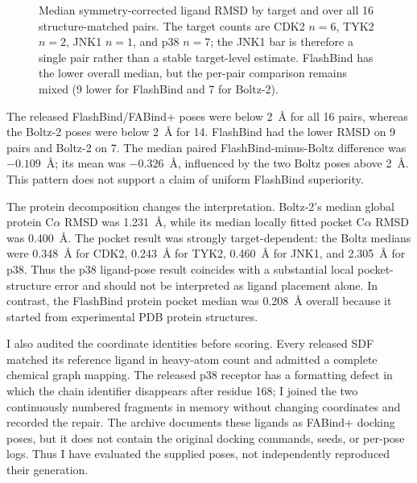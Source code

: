 \documentclass[11pt]{article}
\begin{document}
\begin{figure}[H]
\centering
{}
\caption{Median symmetry-corrected ligand RMSD by target and over all 16
structure-matched pairs. The target counts are CDK2 $n=6$, TYK2 $n=2$, JNK1
$n=1$, and p38 $n=7$; the JNK1 bar is therefore a single pair rather than a
stable target-level estimate. FlashBind has the lower overall median, but the
per-pair comparison remains mixed (9 lower for FlashBind and 7 for Boltz-2).}
\end{figure}

The released FlashBind/FABind+ poses were below 2~\AA{} for all 16 pairs,
whereas the Boltz-2 poses were below 2~\AA{} for 14. FlashBind had the lower
RMSD on 9 pairs and Boltz-2 on 7. The median paired FlashBind-minus-Boltz
difference was $-0.109$~\AA; its mean was $-0.326$~\AA, influenced by the two
Boltz poses above 2~\AA. This pattern does not support a claim of uniform
FlashBind superiority.

The protein decomposition changes the interpretation. Boltz-2's median global
protein C$\alpha$ RMSD was 1.231~\AA, while its median locally fitted pocket
C$\alpha$ RMSD was 0.400~\AA. The pocket result was strongly target-dependent:
the Boltz medians were 0.348~\AA{} for CDK2, 0.243~\AA{} for TYK2,
0.460~\AA{} for JNK1, and 2.305~\AA{} for p38. Thus the p38 ligand-pose result
coincides with a substantial local pocket-structure error and should not be
interpreted as ligand placement alone. In contrast, the FlashBind protein
pocket median was 0.208~\AA{} overall because it started from experimental PDB
protein structures.

I also audited the coordinate identities before scoring. Every released SDF
matched its reference ligand in heavy-atom count and admitted a complete
chemical graph mapping. The released p38 receptor has a formatting defect in
which the chain identifier disappears after residue 168; I joined the two
continuously numbered fragments in memory without changing coordinates and
recorded the repair. The archive documents these ligands as FABind+ docking
poses, but it does not contain the original docking commands, seeds, or
per-pose logs. Thus I have evaluated the supplied poses, not independently
reproduced their generation.
\end{document}

